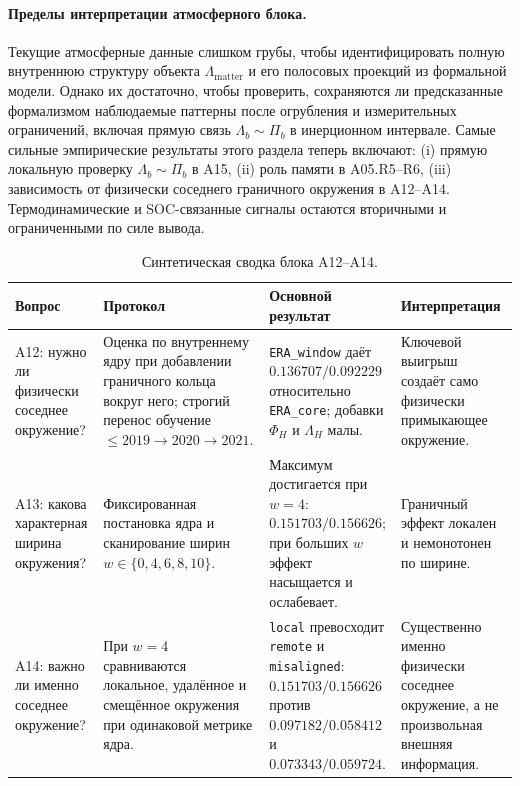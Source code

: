 \documentclass[11pt,a4paper]{article}
\theoremstyle{definition}
\theoremstyle{plain}
\theoremstyle{remark}
\begin{document}
\paragraph{Пределы интерпретации атмосферного блока.}
Текущие атмосферные данные слишком грубы, чтобы идентифицировать полную внутреннюю структуру объекта $\Lambda_{\mathrm{matter}}$ и его полосовых проекций из формальной модели.
Однако их достаточно, чтобы проверить, сохраняются ли предсказанные формализмом наблюдаемые паттерны после огрубления и измерительных ограничений, включая прямую связь $\Lambda_b\sim\Pi_b$ в инерционном интервале.
Самые сильные эмпирические результаты этого раздела теперь включают: (i) прямую локальную проверку \(\Lambda_b\sim\Pi_b\) в A15, (ii) роль памяти в A05.R5--R6, (iii) зависимость от физически соседнего граничного окружения в A12--A14. Термодинамические и SOC-связанные сигналы остаются вторичными и ограниченными по силе вывода.

\begin{table}[H]
\centering
\caption{Синтетическая сводка блока A12--A14.}
\label{tab:A12_A14_summary}
\small
\begin{tabular}{@{}p{2.8cm}p{3.9cm}p{4.0cm}p{4.0cm}@{}}
\toprule
Вопрос & Протокол & Основной результат & Интерпретация \\
\midrule
A12: нужно ли физически соседнее окружение? & Оценка по внутреннему ядру при добавлении граничного кольца вокруг него; строгий перенос обучение$\le 2019 \rightarrow 2020 \rightarrow 2021$. & \texttt{ERA\_window} даёт $0.136707/0.092229$ относительно \texttt{ERA\_core}; добавки $\Phi_H$ и $\Lambda_H$ малы. & Ключевой выигрыш создаёт само физически примыкающее окружение. \\
A13: какова характерная ширина окружения? & Фиксированная постановка ядра и сканирование ширин $w\in\{0,4,6,8,10\}$. & Максимум достигается при $w=4$: $0.151703/0.156626$; при больших $w$ эффект насыщается и ослабевает. & Граничный эффект локален и немонотонен по ширине. \\
A14: важно ли именно соседнее окружение? & При $w=4$ сравниваются локальное, удалённое и смещённое окружения при одинаковой метрике ядра. & \texttt{local} превосходит \texttt{remote} и \texttt{misaligned}: $0.151703/0.156626$ против $0.097182/0.058412$ и $0.073343/0.059724$. & Существенно именно физически соседнее окружение, а не произвольная внешняя информация. \\
\bottomrule
\end{tabular}
\end{table}
\end{document}
